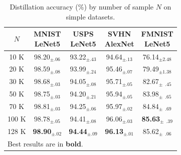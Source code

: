 \begin{table}[h] %
    \caption{Distillation accuracy (\%) by number of sample $N$ on simple datasets.}
    \centering
    \begin{tabular}{c|c|c|c|c}
        \hline
            $N$
            & \makecell{\textbf{MNIST}   \\ LeNet5}
            & \makecell{\textbf{USPS}    \\ LeNet5}
            & \makecell{\textbf{SVHN}    \\ AlexNet}
            & \makecell{\textbf{FMNIST}  \\ LeNet5} \\
        \hline
        \phantom{0}10 K &          98.20$_{\pm .06}$ &          93.22$_{\pm .43}$ &          94.64$_{\pm .13}$ &                    76.14$_{\pm 2.48}$ \\
        \phantom{0}20 K &          98.59$_{\pm .08}$ &          93.99$_{\pm .24}$ &          95.46$_{\pm .07}$ &                    79.49$_{\pm 1.38}$ \\
        \phantom{0}30 K &          98.68$_{\pm .03}$ &          94.05$_{\pm .08}$ &          95.71$_{\pm .05}$ &          82.67$_{\pm \phantom{0}.45}$ \\
        \phantom{0}50 K &          98.75$_{\pm .03}$ &          94.20$_{\pm .21}$ &          95.94$_{\pm .05}$ &          83.98$_{\pm \phantom{0}.65}$ \\
        \phantom{0}70 K &          98.81$_{\pm .03}$ &          94.25$_{\pm .06}$ &          95.97$_{\pm .02}$ &          84.84$_{\pm \phantom{0}.69}$ \\
                  100 K &          98.78$_{\pm .05}$ &          94.41$_{\pm .08}$ &          96.06$_{\pm .03}$ & \textbf{85.63}$_{\pm \phantom{0}.39}$ \\
                  128 K & \textbf{98.90}$_{\pm .02}$ & \textbf{94.44}$_{\pm .09}$ & \textbf{96.13}$_{\pm .01}$ &          85.62$_{\pm \phantom{0}.06}$ \\
        \hline
        \multicolumn{5}{l}{Best results are in \textbf{bold}.} \\
    \end{tabular}
    \label{tab:abla-nsamples-simple}
\end{table}


